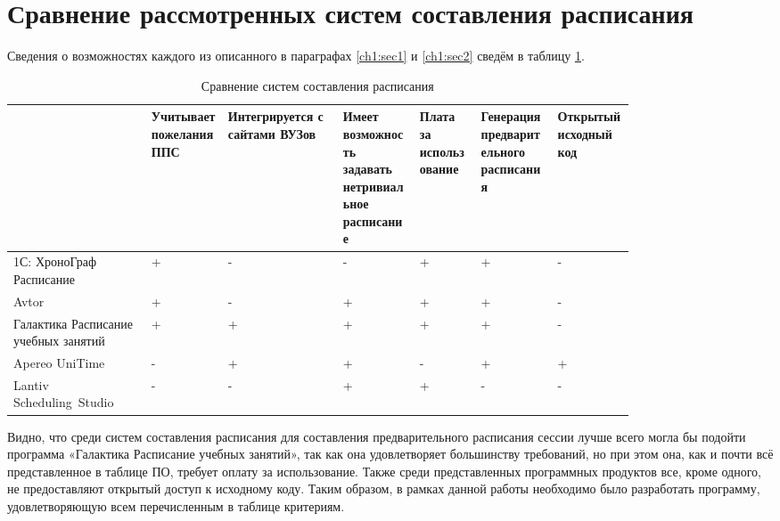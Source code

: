 \section{Сравнение рассмотренных систем составления расписания }  \label{ch1:sec3}
Сведения о возможностях каждого из описанного в параграфах	\ref{ch1:sec1} и \ref{ch1:sec2} сведём в таблицу \ref{tab:1.3.1}.
\begin{table} [htbp]
	\centering\small
	\caption{Сравнение систем составления расписания}%
	\label{tab:1.3.1}	
	\begin{tabular}{|p{0.18\linewidth}|p{0.1\linewidth}|p{0.15\linewidth}|p{0.1\linewidth}|p{0.08\linewidth}|p{0.1\linewidth}|p{0.1\linewidth}|}
		\hline
		&Учитывает пожелания ППС&Интегрируется с сайтами ВУЗов&Имеет возможность задавать нетривиальное расписание&Плата за использование&Генерация предварительного расписания&Открытый исходный код\\
		\hline
		1С: ХроноГраф Расписание&+&-&-&+&+&-\\ \hline
		Avtor&+&-&+&+&+&-\\ \hline
		Галактика Расписание учебных занятий&+&+&+&+&+&-\\ \hline
		Apereo UniTime&-&+&+&-&+&+\\ \hline
		Lantiv Scheduling Studio&-&-&+&+&-&-\\ \hline	
	\end{tabular}
\end{table}

Видно, что среди систем составления расписания для составления предварительного расписания сессии лучше всего могла бы подойти программа «Галактика Расписание учебных занятий», так как она удовлетворяет большинству требований, но при этом она, как и почти всё представленное в таблице ПО, требует оплату за использование. Также среди представленных программных продуктов все, кроме одного, не предоставляют открытый доступ к исходному коду. 
Таким образом, в рамках данной работы необходимо было разработать программу, удовлетворяющую всем перечисленным в таблице критериям.

